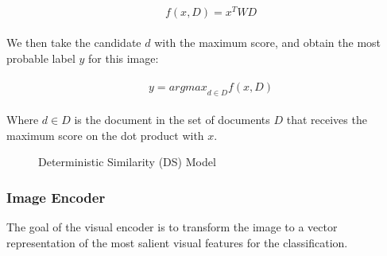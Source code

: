 \documentclass[11pt,a4paper]{article}
\begin{document}
\begin{equation}
\label{equation:attention}
\begin{aligned}
\begin{split}
&f(x,D)=x^TWD
\end{split}

\end{aligned}
\end{equation}

 We then take the candidate $d$ with the maximum score, and obtain the most probable label  $y$ for this image:

\begin{equation}
\label{equation:attention}
\begin{aligned}
\begin{split}
&y={argmax}_{d\in D}f(x,D)
\end{split}

\end{aligned}
\end{equation}

Where $d\in D$ is the document in the set of documents $D$ that receives the maximum score on the dot product with $x$. 



\begin{figure}[t]
\centering
{}
 \caption{Deterministic Similarity (DS) Model}
\label{fig:DS}
\end{figure}

\subsubsection{Image Encoder}
\label{section:Image_Encoder}
The goal of the visual encoder is to transform the image to a vector representation of the most salient visual features for the classification.\par
\end{document}
